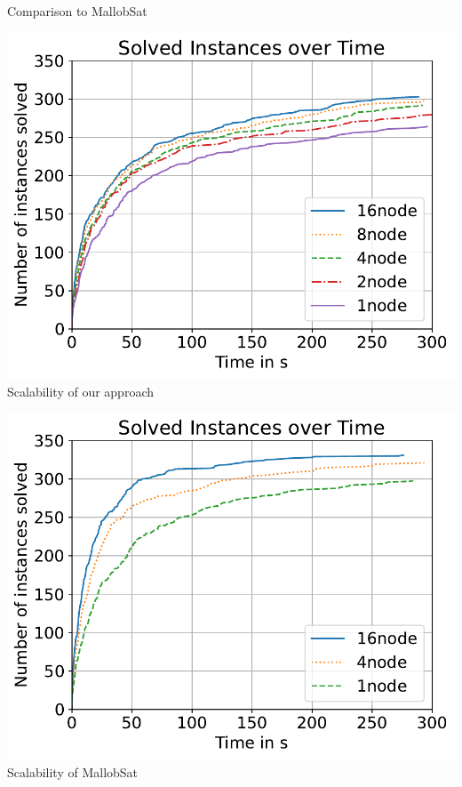 \documentclass{beamer}
\begin{document}
\begin{frame}{Comparison to MallobSat}
    \begin{minipage}{0.45\textwidth}
        \center
        \includegraphics[scale=.3]{plots/cumulative_runtime/scalability_gim.pdf}
        Scalability of our approach
    \end{minipage}
    \hfill
    \begin{minipage}{0.45\textwidth}
        \center
        \includegraphics[scale=.3]{plots/cumulative_runtime/scalability_kis.pdf}
        Scalability of MallobSat%
    \end{minipage}
\end{frame}
\end{document}
